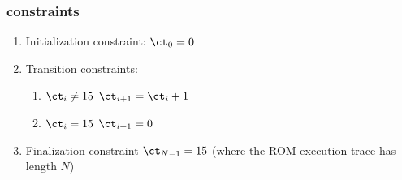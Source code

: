 \subsubsection{\CT{} constraints}

\begin{enumerate}
    \item Initialization  constraint: $\ct_{0} = 0$
    \item Transition constraints:
    \begin{enumerate}
        \item \If $\ct_{i}\neq 15$ \Then $\ct_{i+1} = \ct_{i} + 1$
        \item \If $\ct_{i}= 15$ \Then $\ct_{i+1} = 0$
    \end{enumerate}
    \item Finalization constraint $\ct_{N-1} = 15$ (where the ROM execution trace has length $N$)
\end{enumerate}